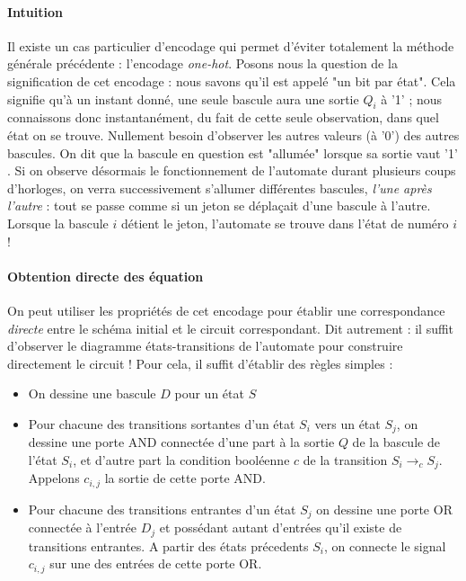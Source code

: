 \paragraph{Intuition} Il existe un cas particulier d'encodage qui permet d'éviter totalement la méthode générale précédente : l'encodage {\it one-hot}. Posons nous
la question de la signification de cet encodage : nous savons qu'il est appelé "un bit par état". Cela signifie qu'à un instant donné, une seule bascule
aura une sortie $Q_i$ à '1' ; nous connaissons donc instantanément, du fait de cette seule observation, dans quel état on se trouve.
Nullement besoin d'observer les autres valeurs (à '0') des autres bascules. On dit que la bascule en question est "allumée" lorsque sa sortie vaut '1' .
Si on observe désormais le fonctionnement de l'automate durant plusieurs coups d'horloges, on verra successivement s'allumer différentes bascules,
{\it l'une après l'autre} : tout se passe comme si un jeton se déplaçait d'une bascule à l'autre. Lorsque la bascule $i$ détient le jeton, l'automate se trouve dans l'état de numéro $i$ !



\paragraph{Obtention directe des équation} On peut utiliser les propriétés de cet encodage pour établir une correspondance {\it directe} entre le schéma initial et le circuit correspondant.
Dit autrement : il suffit d'observer le diagramme états-transitions de l'automate pour construire directement le circuit !
Pour cela, il suffit d'établir des règles simples :

\begin{itemize}
  \item On dessine une bascule $D$ pour un état $S$
  \item Pour chacune des transitions sortantes d'un état $S_i$ vers un état $S_j$, on dessine une porte AND connectée d'une part à la sortie $Q$ de la bascule de l'état $S_i$, et
  d'autre part la condition booléenne $c$ de la transition $S_i\rightarrow_{c} S_j$. Appelons $c_{i,j}$ la sortie de cette porte AND.
  \item Pour chacune des transitions entrantes d'un état $S_j$ on dessine une porte OR connectée à l'entrée $D_j$ et possédant autant d'entrées qu'il existe de transitions entrantes.
  A partir des états précedents $S_i$, on connecte le signal $c_{i,j}$ sur une des entrées de cette porte OR.
\end{itemize}

